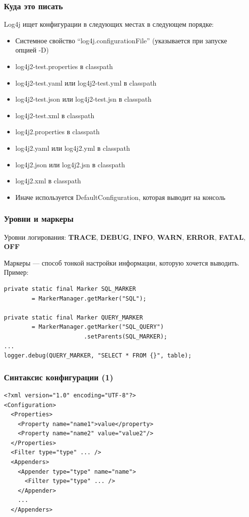 \documentclass[xetex,mathserif,serif]{beamer}
\begin{document}
	\begin{frame}
		\frametitle{Куда это писать}
		Log4j ищет конфигурации в следующих местах в следующем порядке:
		\begin{itemize}
			\item Системное свойство ``log4j.configurationFile'' (указывается при запуске опцией -D)
			\item log4j2-test.properties в classpath
			\item log4j2-test.yaml или log4j2-test.yml в classpath
			\item log4j2-test.json или log4j2-test.jsn в classpath
			\item log4j2-test.xml в classpath
			\item log4j2.properties в classpath
			\item log4j2.yaml или log4j2.yml в classpath
			\item log4j2.json или log4j2.jsn в classpath
			\item log4j2.xml в classpath
			\item Иначе используется DefaultConfiguration, которая выводит на консоль
		\end{itemize}
	\end{frame}

	\begin{frame}[fragile]
		\frametitle{Уровни и маркеры}
		Уровни логирования: \textbf{TRACE}, \textbf{DEBUG}, \textbf{INFO}, \textbf{WARN}, \textbf{ERROR}, \textbf{FATAL}, \textbf{OFF}

		Маркеры --- способ тонкой настройки информации, которую хочется выводить. Пример:
		\begin{verbatim}
private static final Marker SQL_MARKER 
        = MarkerManager.getMarker("SQL");

private static final Marker QUERY_MARKER 
        = MarkerManager.getMarker("SQL_QUERY")
                       .setParents(SQL_MARKER);
...
logger.debug(QUERY_MARKER, "SELECT * FROM {}", table);
		\end{verbatim}
\end{frame}

	\begin{frame}[fragile]
		\frametitle{Синтаксис конфигурации (1)}
		\begin{verbatim}
<?xml version="1.0" encoding="UTF-8"?>
<Configuration>
  <Properties>
    <Property name="name1">value</property>
    <Property name="name2" value="value2"/>
  </Properties>
  <Filter type="type" ... />
  <Appenders>
    <Appender type="type" name="name">
      <Filter type="type" ... />
    </Appender>
    ...
  </Appenders>
		\end{verbatim}
\end{frame}
\end{document}
